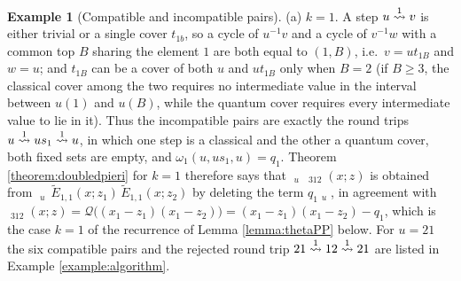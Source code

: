 \documentclass{amsart}
\theoremstyle{definition}
\newtheorem{example}[lemma]{Example}
\theoremstyle{remark}
\numberwithin{equation}{section}
\DeclareMathOperator{\qsch}{\widetilde{\mathfrak{S}}}
\newcommand{\xrightsquigarrow}[2][]{%
	\mathrel{\mathop{\rightsquigarrow}\limits^{\scriptstyle #2}%
	\ifx\hfuzz#1\hfuzz\else_{\scriptstyle #1}\fi}%
}
\newcommand{\tom}[1]{\ensuremath{\xrightsquigarrow{#1}}}
\newcommand{\qelem}{\widetilde{E}}
\begin{document}
\begin{example}[Compatible and incompatible pairs] \label{example:doubled}
(a) $k=1$. A step $u\tom1v$ is either trivial or a single cover $t_{1b}$, so a cycle of $u^{-1}v$ and a cycle of $v^{-1}w$ with a common top $B$ sharing the element $1$ are both equal to $(1,B)$, i.e.\ $v=ut_{1B}$ and $w=u$; and $t_{1B}$ can be a cover of both $u$ and $ut_{1B}$ only when $B=2$ (if $B\geq3$, the classical cover among the two requires no intermediate value in the interval between $u(1)$ and $u(B)$, while the quantum cover requires every intermediate value to lie in it). Thus the incompatible pairs are exactly the round trips $u\tom1us_1\tom1u$, in which one step is a classical and the other a quantum cover, both fixed sets are empty, and $\omega_1(u,us_1,u)=q_1$. Theorem \ref{theorem:doubledpieri} for $k=1$ therefore says that $\qsch_u\,\qsch_{312}(x;z)$ is obtained from $\qsch_u\,\qelem_{1,1}(x;z_1)\,\qelem_{1,1}(x;z_2)$ by deleting the term $q_1\qsch_u$, in agreement with $\qsch_{312}(x;z)=\mathcal Q\big((x_1-z_1)(x_1-z_2)\big)=(x_1-z_1)(x_1-z_2)-q_1$, which is the case $k=1$ of the recurrence of Lemma \ref{lemma:thetaPP} below. For $u=21$ the six compatible pairs and the rejected round trip $21\tom112\tom121$ are listed in Example \ref{example:algorithm}.


\end{example}
\end{document}
